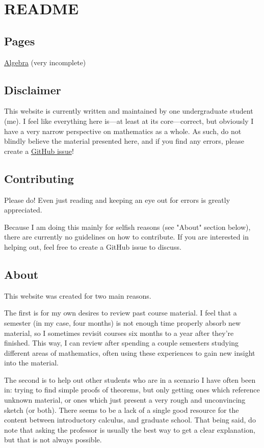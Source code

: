 \documentclass{scrartcl}
\begin{document}
\section{README}

\subsection{Pages}

\href{algebra.html}{Algebra} (very incomplete)

\subsection{Disclaimer}

This website is currently written and maintained by one undergraduate student (me).
I feel like everything here is---at least at its core---correct, but obviously I have a very narrow perspective on
mathematics as a whole.
As such, do not blindly believe the material presented here, and if you find any errors, please create a
\href{https://github.com/xtevenx/ugm/issues}{GitHub issue}!

\subsection{Contributing}

Please do! Even just reading and keeping an eye out for errors is greatly appreciated.

Because I am doing this mainly for selfish reasons (see "About" section below), there are currently no guidelines on
how to contribute.
If you are interested in helping out, feel free to create a GitHub issue to discuss.

\subsection{About}

This website was created for two main reasons.

The first is for my own desires to review past course material.
I feel that a semester (in my case, four months) is not enough time properly absorb new material, so I sometimes
revisit courses six months to a year after they're finished.
This way, I can review after spending a couple semesters studying different areas of mathematics, often using these
experiences to gain new insight into the material.

The second is to help out other students who are in a scenario I have often been in: trying to find simple proofs of
theorems, but only getting ones which reference unknown material, or ones which just present a very rough and
unconvincing sketch (or both).
There seems to be a lack of a single good resource for the content between introductory calculus, and graduate school.
That being said, do note that asking the professor is usually the best way to get a clear explanation, but that is not
always possible.
\end{document}
